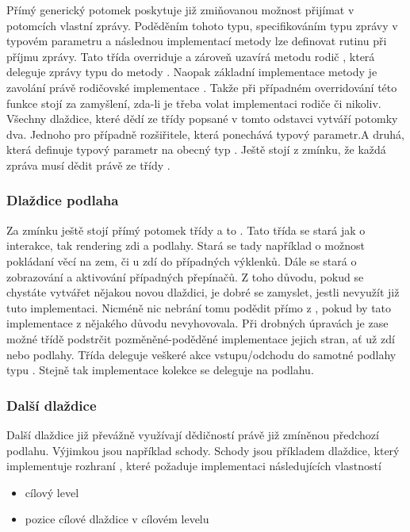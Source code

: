 Přímý generický potomek  poskytuje již zmiňovanou možnost přijímat
v potomcích vlastní zprávy. Poděděním tohoto typu, specifikováním typu zprávy v typovém parametru a následnou implementací metody 
 lze definovat rutinu při příjmu zprávy. Tato třída overriduje a zároveň uzavírá metodu rodič ,
která deleguje zprávy typu  do metody . Naopak základní implementace metody 
je zavolání právě rodičovské implementace . Takže při případném overridování této funkce
stojí za zamyšlení, zda-li  je třeba volat implementaci rodiče či nikoliv. Všechny dlaždice, které dědí ze třídy
popsané v tomto odstavci vytváří potomky dva. Jednoho pro případně rozšiřitele, která ponechává 
typový parametr.A druhá, která definuje typový parametr na obecný typ . Ještě stojí z zmínku,
že každá zpráva musí dědit právě ze třídy .

\subsubsection{Dlaždice podlaha}
Za zmínku ještě stojí přímý potomek třídy  a 
to .  Tato třída se stará jak o interakce, tak rendering
zdi a podlahy. Stará se tady například o možnost pokládaní věcí na zem, či u zdí do případných výklenků. 
Dále se stará  o zobrazování a aktivování případných přepínačů. Z toho důvodu, pokud se chystáte
vytvářet nějakou novou dlaždici, je dobré se zamyslet, jestli  nevyužít již tuto implementaci. Nicméně nic
nebrání tomu podědit přímo z , pokud by tato implementace z
nějakého důvodu nevyhovovala. Při drobných úpravách je zase možné třídě podstrčit pozměněné-poděděné implementace 
jejich stran, ať už zdí nebo podlahy. Třída deleguje veškeré akce vstupu/odchodu do samotné podlahy
typu . Stejně tak implementace kolekce   se deleguje na podlahu.

\subsubsection{Další dlaždice}
Další dlaždice již převážně využívají dědičností právě již zmíněnou předchozí podlahu. Výjimkou jsou například schody.
Schody jsou příkladem  dlaždice, který implementuje rozhraní  ,  které požaduje implementaci 
následujících vlastností
\begin{itemize}
\item cílový level
\item pozice cílové dlaždice v cílovém levelu
\end{itemize}

